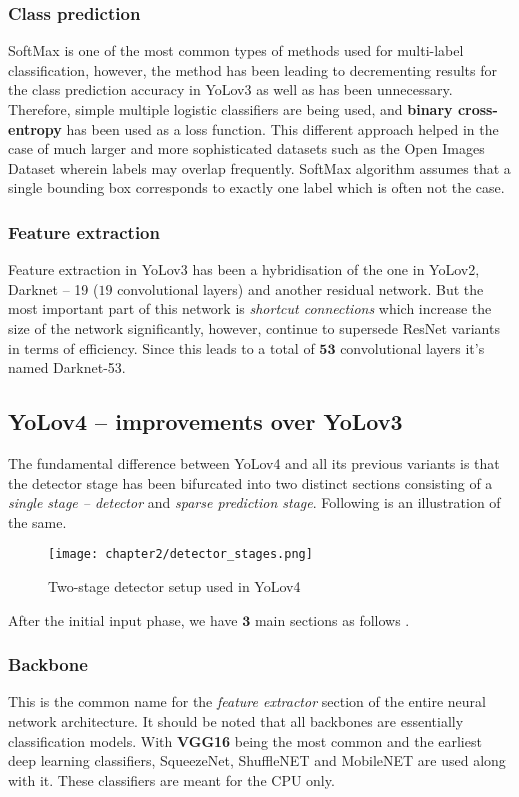 \subsubsection{Class prediction}
SoftMax is one of the most common types of methods used for multi-label classification, however, the method has been leading to decrementing results for the class prediction accuracy in YoLov3 as well as has been unnecessary. Therefore, simple multiple logistic classifiers are being used, and \textbf{binary cross-entropy} has been used as a loss function. This different approach helped in the case of much larger and more sophisticated datasets such as the Open Images Dataset wherein labels may overlap frequently. SoftMax algorithm assumes that a single bounding box corresponds to exactly one label which is often not the case.

\subsubsection{Feature extraction}
Feature extraction in YoLov3 has been a hybridisation of the one in YoLov2, Darknet – 19 ($19$ convolutional layers) and another residual network. But the most important part of this network is \textit{shortcut connections} which increase the size of the network significantly, however, continue to supersede ResNet variants in terms of efficiency. Since this leads to a total of $\boldsymbol{53}$ convolutional layers it's named Darknet-53.


\subsection{YoLov4 – improvements over YoLov3 \cite{bochkovskiy2020yolov4}}

The fundamental difference between YoLov4 and all its previous variants is that the detector stage has been bifurcated into two distinct sections consisting of a \textit{single stage – detector} and \textit{sparse prediction stage}. Following is an illustration of the same.

\begin{figure}[h]
  \centering
  \texttt{[image: chapter2/detector\_stages.png]}
  \caption{Two-stage detector setup used in YoLov4}
  \label{fig:detector}
\end{figure}

After the initial input phase, we have $\boldsymbol{3}$ main sections as follows \cite{Rajput2021}.

\subsubsection{Backbone}
This is the common name for the \textit{feature extractor} section of the entire neural network architecture. It should be noted that all backbones are essentially classification models. With \textbf{VGG16} being the most common and the earliest deep learning classifiers, SqueezeNet, ShuffleNET and MobileNET are used along with it. These classifiers are meant for the CPU only.

